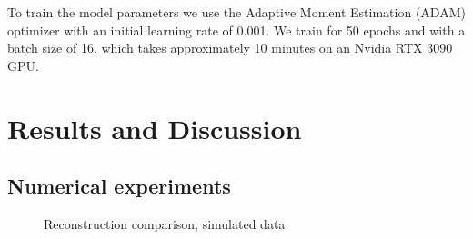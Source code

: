 \documentclass[sn-mathphys]{sn-jnl}%
\theoremstyle{thmstyleone}%
\theoremstyle{thmstyletwo}%
\theoremstyle{thmstylethree}%
\begin{document}
To train the model parameters we use the Adaptive Moment Estimation (ADAM) optimizer with an initial learning rate of 0.001.\cite{kingma2014adam} We train for 50 epochs and with a batch size of 16, which takes approximately 10 minutes on an Nvidia RTX 3090 GPU.


\section{Results and Discussion}

\subsection{Numerical experiments}



\begin{figure}%
    \centering
    \hspace*{0cm}
    \hspace*{0cm}
    \caption{Reconstruction comparison, simulated data}%
    \label{fig:sim_comparison}%
\end{figure}
\end{document}
